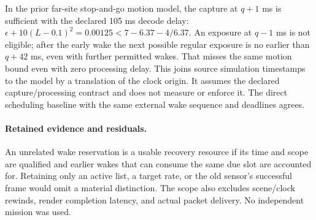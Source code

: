 \documentclass{article}
\begin{document}
In the prior far-site stop-and-go motion model, the capture at
\(q+1\) ms is sufficient with the declared 105 ms decode delay:
\(\epsilon+10(L-0.1)^2=0.00125 < 7-6.37-4/6.37\).
An exposure at \(q-1\) ms is not eligible; after the early wake
the next possible regular exposure is no earlier than \(q+42\) ms,
even with further permitted wakes. That misses the same motion
bound even with zero processing delay. This joins source
simulation timestamps to the model by a translation of the clock
origin. It assumes the declared capture/processing contract and does
not measure or enforce it. The direct scheduling baseline with the
same external wake sequence and deadlines agrees.

\paragraph{Retained evidence and residuals.}
An unrelated wake reservation is a usable recovery resource if its
time and scope are qualified and earlier wakes that can consume the
same due slot are accounted for. Retaining only an active list, a
target rate, or the old sensor's successful frame would omit a
material distinction. The scope also excludes scene/clock rewinds,
render completion latency, and actual packet delivery. No
independent mission was used.
\end{document}
